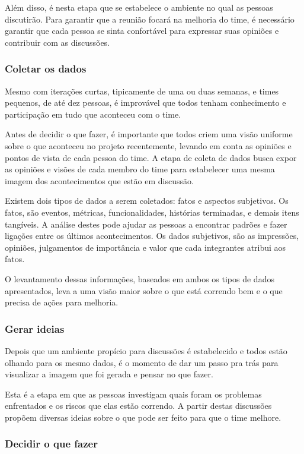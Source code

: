 Além disso, é nesta etapa que se estabelece o ambiente no qual as pessoas discutirão. Para garantir que a reunião focará na melhoria do time, é necessário garantir que cada pessoa se sinta confortável para expressar suas opiniões e contribuir com as discussões.

\subsubsection*{Coletar os dados}

Mesmo com iterações curtas, tipicamente de uma ou duas semanas, e times pequenos, de até dez pessoas, é improvável que todos tenham conhecimento e participação em tudo que aconteceu com o time.

Antes de decidir o que fazer, é importante que todos criem uma visão uniforme sobre o que aconteceu no projeto recentemente, levando em conta as opiniões e pontos de vista de cada pessoa do time. A etapa de coleta de dados busca expor as opiniões e visões de cada membro do time para estabelecer uma mesma imagem dos acontecimentos que estão em discussão.

Existem dois tipos de dados a serem coletados: fatos e aspectos subjetivos. Os fatos, são eventos, métricas, funcionalidades, histórias terminadas, e demais itens tangíveis. A análise destes pode ajudar as pessoas a encontrar padrões e fazer ligações entre os últimos acontecimentos. Os dados subjetivos, são as impressões, opiniões, julgamentos de importância e valor que cada integrantes atribui aos fatos.

O levantamento dessas informações, baseados em ambos os tipos de dados apresentados, leva a uma visão maior sobre o que está correndo bem e o que precisa de ações para melhoria.

\subsubsection*{Gerar ideias}

Depois que um ambiente propício para discussões é estabelecido e todos estão olhando para os mesmo dados, é o momento de dar um passo pra trás para visualizar a imagem que foi gerada e pensar no que fazer. 

Esta é a etapa em que as pessoas investigam quais foram os problemas enfrentados e os riscos que elas estão correndo. A partir destas discussões propõem diversas ideias sobre o que pode ser feito para que o time melhore.

\subsubsection*{Decidir o que fazer}

